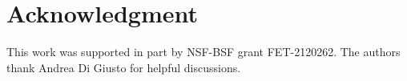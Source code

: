 \documentclass[conference,letterpaper]{IEEEtran}
\newcommand{\gaussbinom}[2]{\left[ \genfrac{}{}{0pt}{}{#1}{#2} \right]_2}
\begin{document}
\section*{Acknowledgment}
This work was supported in part by NSF-BSF
grant FET-2120262. The authors thank Andrea Di Giusto for helpful discussions. %





% 

\end{document}
